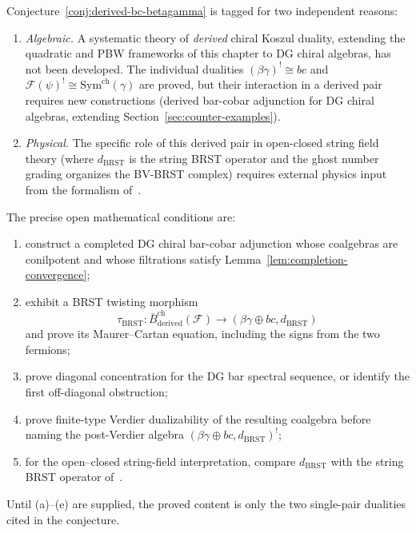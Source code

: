 \begin{remark}[Scope]\label{rem:scope-curved-koszul}
Conjecture~\ref{conj:derived-bc-betagamma} is tagged
\ClaimStatusConjectured{} for two independent reasons:
\begin{enumerate}
\item \emph{Algebraic.} A systematic theory of \emph{derived} chiral
 Koszul duality, extending the quadratic and PBW frameworks of
 this chapter to DG chiral algebras, has not been developed.
 The individual dualities $(\beta\gamma)^! \cong bc$ and
 $\mathcal{F}(\psi)^! \cong \mathrm{Sym}^{\mathrm{ch}}(\gamma)$
 are proved, but their interaction in a derived pair requires new
 constructions (derived bar-cobar adjunction for DG chiral algebras,
 extending Section~\ref{sec:counter-examples}).
\item \emph{Physical.} The specific role of this derived pair in
 open-closed string field theory (where $d_{\mathrm{BRST}}$ is the
 string BRST operator and the ghost number grading organizes the
 BV-BRST complex) requires external physics input from the
 formalism of~\cite{Zwi93}.
\end{enumerate}

The precise open mathematical conditions are:
\begin{enumerate}[label=\textup{(\alph*)}]
\item construct a completed DG chiral bar-cobar adjunction whose
 coalgebras are conilpotent and whose filtrations satisfy
 Lemma~\ref{lem:completion-convergence};
\item exhibit a BRST twisting morphism
 \[
 \tau_{\mathrm{BRST}}\colon
 \bar{B}^{\mathrm{ch}}_{\mathrm{derived}}(\mathcal F)
 \longrightarrow
 (\beta\gamma\oplus bc,d_{\mathrm{BRST}})
 \]
 and prove its Maurer--Cartan equation, including the signs from the two
 fermions;
\item prove diagonal concentration for the DG bar spectral sequence, or
 identify the first off-diagonal obstruction;
\item prove finite-type Verdier dualizability of the resulting
 coalgebra before naming the post-Verdier algebra
 $(\beta\gamma\oplus bc,d_{\mathrm{BRST}})^!$;
\item for the open--closed string-field interpretation, compare
 $d_{\mathrm{BRST}}$ with the string BRST operator of~\cite{Zwi93}.
\end{enumerate}
Until \textup{(a)}--\textup{(e)} are supplied, the proved content is only
the two single-pair dualities cited in the conjecture.
\end{remark}

